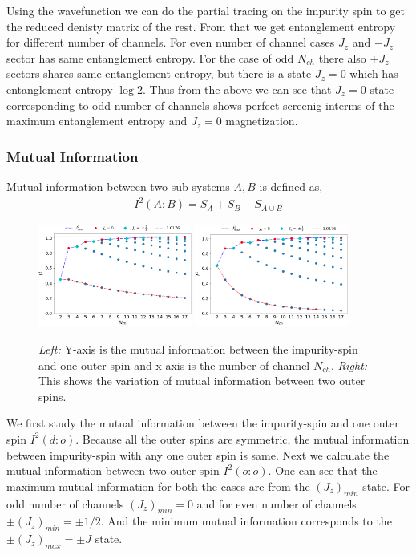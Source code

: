 \documentclass[reprint,prb,superscriptaddress]{revtex4-2}
\begin{document}
\noindent Using the wavefunction we can do the partial tracing on the impurity spin to get the reduced denisty matrix of the rest. From that we get entanglement entropy for different number of channels. For even number of channel cases $J_z$ and $-J_z$ sector has same entanglement entropy. For the case of odd $N_{ch}$ there also $\pm J_z$ sectors shares same entanglement entropy, but there is a state $J_z=0$ which has entanglement entropy $\log 2$. Thus from the above we can see that $J_z=0$ state corresponding to odd number of channels shows perfect screenig interms of the maximum entanglement entropy and $J_z=0$ magnetization.


\subsubsection{Mutual Information}

Mutual information between two sub-systems $A, B$ is defined as, 
\begin{eqnarray}
I^2(A:B)=S_A+S_B-S_{A\cup B}
\end{eqnarray}

\begin{figure}[!ht]
\centering
\includegraphics[width=0.45\textwidth]{plt/I_2_vs_Nch_0_1}
\includegraphics[width=0.45\textwidth]{plt/I_2_vs_Nch_1_2}
\caption{\textit{Left:} Y-axis is the mutual information between the impurity-spin and one outer spin and x-axis is the number of channel $N_{ch}$. \textit{Right:} This shows the variation of mutual information between two outer spins.}
\label{fig:MI_vs_Nch}
\end{figure}

We first study the mutual information between the impurity-spin and one outer spin $I^2(d:o)$. Because all the outer spins are symmetric, the mutual information between impurity-spin with any one outer spin is same. Next we calculate the mutual information between two outer spin $I^2(o:o)$. One can see that the maximum mutual information for both the cases are from the $(J_z)_{min}$ state. For odd number of channels $(J_z)_{min}=0$ and for even number of channels $\pm (J_z)_{min}=\pm 1/2$. And the minimum mutual information corresponds to the $\pm (J_z)_{max}=\pm J$ state.\\
\end{document}

